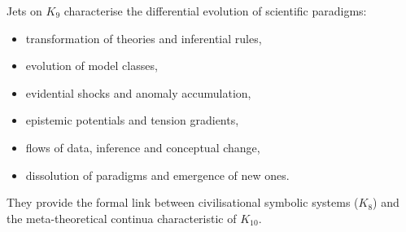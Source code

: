 Jets on $K_9$ characterise the differential evolution of scientific
paradigms:
\begin{itemize}
    \item transformation of theories and inferential rules,
    \item evolution of model classes,
    \item evidential shocks and anomaly accumulation,
    \item epistemic potentials and tension gradients,
    \item flows of data, inference and conceptual change,
    \item dissolution of paradigms and emergence of new ones.
\end{itemize}

They provide the formal link between civilisational symbolic systems
($K_8$) and the meta-theoretical continua characteristic of $K_{10}$.
